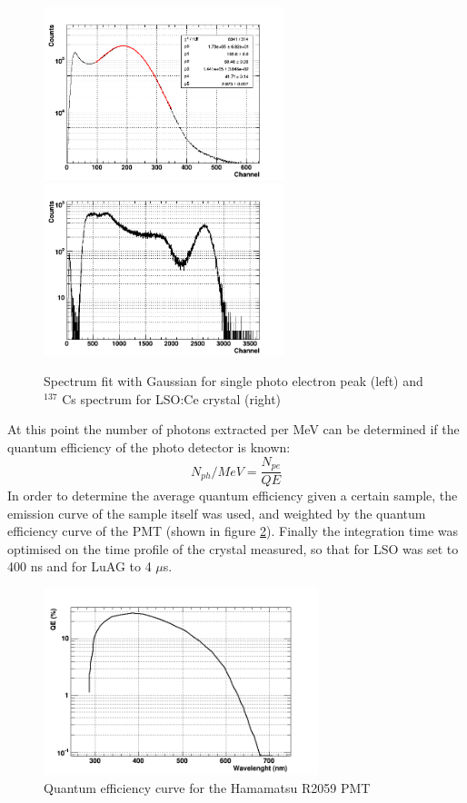 \begin{figure}[htbp]
\begin{center}
\includegraphics[width=7cm]{../Pictures/Chapter_5/single.png}
\includegraphics[width=7cm]{../Pictures/Chapter_5/spectrum_LY.png}
\end{center}
\caption[Single electron and LSO $^{137}$ Cs spectrum]{Spectrum fit with Gaussian for single photo electron peak (left) and $^{137}$ Cs spectrum for LSO:Ce crystal (right)}
\label{fig:spectrum}
\end{figure}

At this point the number of photons extracted per MeV can be determined if the quantum efficiency of the photo detector is known:
\begin{equation}
N_{ph}/MeV=\frac{N_{pe}}{QE}
\end{equation}
In order to determine the average quantum efficiency given a certain sample, the emission curve of the sample itself was used, and weighted by the quantum efficiency curve of the PMT (shown in figure \ref{fig:QE}).
Finally the integration time was optimised on the time profile of the crystal measured, so that for LSO was set to 400 ns and for LuAG to 4 $\mu$s.
\begin{figure}[htbp]
\begin{center}
\includegraphics[width=8cm]{../Pictures/Chapter_5/qe.png}
\end{center}
\caption[QE of R2059 PMT]{Quantum efficiency curve for the Hamamatsu R2059 PMT}
\label{fig:QE}
\end{figure}

